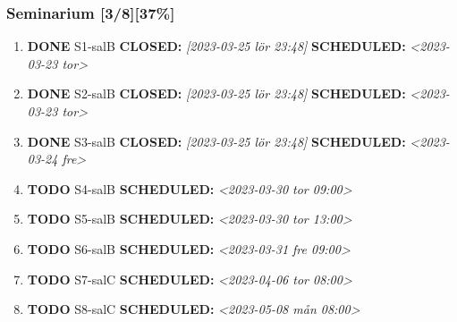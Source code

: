 \documentclass[11pt]{article}
\begin{document}
\subsubsection{Seminarium [3/8][37\%]}
\label{sec:orgabce2db}
\begin{enumerate}
\item {\bfseries\sffamily DONE} S1-salB
\label{sec:org48dd82f}
\noindent\textbf{CLOSED:} \textit{[2023-03-25 lör 23:48] } \textbf{SCHEDULED:} \textit{<2023-03-23 tor>}\\[0pt]
\item {\bfseries\sffamily DONE} S2-salB
\label{sec:org4f80d58}
\noindent\textbf{CLOSED:} \textit{[2023-03-25 lör 23:48] } \textbf{SCHEDULED:} \textit{<2023-03-23 tor>}\\[0pt]
\item {\bfseries\sffamily DONE} S3-salB
\label{sec:org537bfac}
\noindent\textbf{CLOSED:} \textit{[2023-03-25 lör 23:48] } \textbf{SCHEDULED:} \textit{<2023-03-24 fre>}\\[0pt]
\item {\bfseries\sffamily TODO} S4-salB
\label{sec:orgca944e6}
\noindent\textbf{SCHEDULED:} \textit{<2023-03-30 tor 09:00>}\\[0pt]
\item {\bfseries\sffamily TODO} S5-salB
\label{sec:orgeb2eb93}
\noindent\textbf{SCHEDULED:} \textit{<2023-03-30 tor 13:00>}\\[0pt]
\item {\bfseries\sffamily TODO} S6-salB
\label{sec:orgf0a1522}
\noindent\textbf{SCHEDULED:} \textit{<2023-03-31 fre 09:00>}\\[0pt]
\item {\bfseries\sffamily TODO} S7-salC
\label{sec:org63ce899}
\noindent\textbf{SCHEDULED:} \textit{<2023-04-06 tor 08:00>}\\[0pt]
\item {\bfseries\sffamily TODO} S8-salC
\label{sec:orgcc0a354}
\noindent\textbf{SCHEDULED:} \textit{<2023-05-08 mån 08:00>}\\[0pt]
\end{enumerate}
\end{document}
